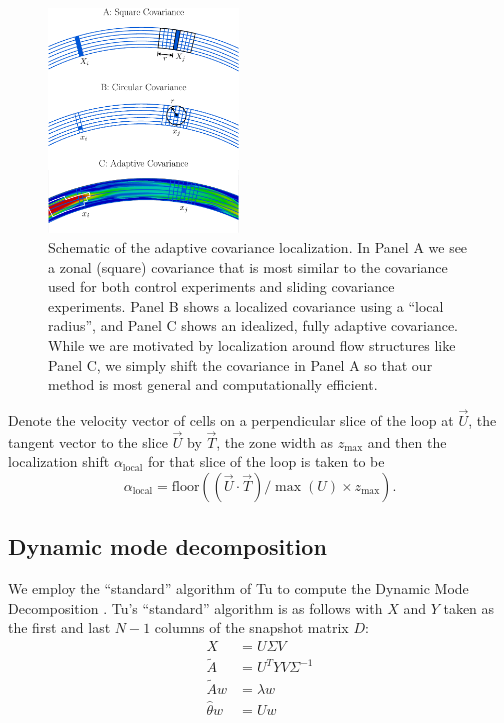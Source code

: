 \begin{figure}[h]
  \centering
  \includegraphics[width=0.45\textwidth]{figures/covariance-localization-schematic-labeled-004.pdf}
  \caption[]{
    Schematic of the adaptive covariance localization.
    In Panel A we see a zonal (square) covariance that is most similar to the covariance used for both control experiments and sliding covariance experiments.
    Panel B shows a localized covariance using a ``local radius'', and Panel C shows an idealized, fully adaptive covariance.
    While we are motivated by localization around flow structures like Panel C, we simply shift the covariance in Panel A so that our method is most general and computationally efficient.
  }
  \label{fig:covariance-localization-schematic}
\end{figure}

Denote the velocity vector of cells on a perpendicular slice of the loop at $\vec{U}$, the tangent vector to the slice $\vec{U}$ by $\vec{T}$, the zone width as $z_{\text{max}}$ and then the localization shift $\alpha_{\text{local}}$ for that slice of the loop is taken to be
\begin{equation} \alpha_{\text{local}} = \text{floor} \left( (\vec{U} \cdot \vec{T})/\max (U) \times z_{\text{max}} \right) . \end{equation}

\subsection*{Dynamic mode decomposition}

We employ the ``standard'' algorithm of Tu to compute the Dynamic Mode Decomposition \cite{tu2013dynamic}.
Tu's ``standard'' algorithm is as follows with $X$ and $Y$ taken as the first and last $N-1$ columns of the snapshot matrix $D$:
\begin{align*} X &= U\Sigma V \tag*{(Take SVD of $X$.)}\\
  \tilde{A} &= U^T Y V \Sigma ^{-1} \tag*{(Build the $A$ matrix.)}\\
  \tilde{A}w &= \lambda w \tag*{(Compute eigenvectors and values.)}\\
  \hat{\theta}w &= U w \tag*{(Compute corresponding modes.)}\end{align*}

